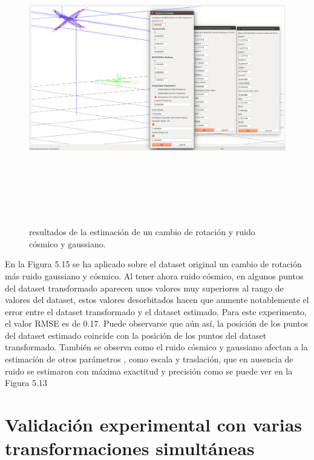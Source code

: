 \begin{figure}[h]
\begin{center}
\label{fig:opciones de View}\includegraphics[height=12.0cm,width=18.0cm]{img/cap6/Rota_Gauss_Cosmic_abba.png}
\hspace{0.5cm}

\end{center}

\caption{ resultados de la estimación de un cambio de rotación y ruido cósmico y gaussiano.}
\end{figure}

En la Figura 5.15 se ha aplicado sobre el dataset original un cambio de rotación más ruido gaussiano y cósmico. Al tener ahora ruido cósmico, en algunos puntos del dataset transformado aparecen unos valores muy superiores al rango de valores del dataset, estos valores desorbitados hacen que aumente notablemente el error entre el dataset transformado y el dataset estimado. Para este experimento, el valor RMSE es de 0.17.  Puede observarse que aún así, la posición de los puntos del dataset estimado coincide con la posición de los puntos del dataset transformado.
También se observa como el ruido cósmico y gaussiano afectan a la estimación de otros parámetros , como escala y traslación, que en ausencia de ruido se estimaron con máxima exactitud y precisión como se puede ver en la Figura 5.13



\newpage
\section{Validación experimental con varias transformaciones simultáneas}

